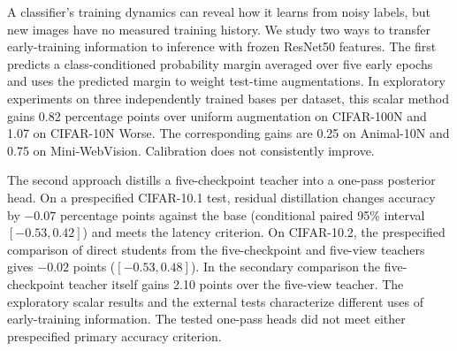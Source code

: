 A classifier's training dynamics can reveal how it learns from noisy
labels, but new images have no measured training history. We study two
ways to transfer early-training information to inference with frozen
ResNet50 features. The first predicts a class-conditioned probability
margin averaged over five early epochs and uses the predicted margin to
weight test-time augmentations. In exploratory experiments on three
independently trained bases per dataset, this scalar method gains 0.82
percentage points over uniform augmentation on CIFAR-100N and 1.07 on
CIFAR-10N Worse. The corresponding gains are 0.25 on Animal-10N and 0.75
on Mini-WebVision. Calibration does not consistently improve.

The second approach distills a five-checkpoint teacher into a one-pass
posterior head. On a prespecified CIFAR-10.1 test, residual distillation
changes accuracy by $-0.07$ percentage points against the base
(conditional paired 95\% interval $[-0.53, 0.42]$) and meets the latency
criterion. On CIFAR-10.2, the prespecified comparison of direct students
from the five-checkpoint and five-view teachers gives $-0.02$ points
($[-0.53, 0.48]$). In the secondary comparison the five-checkpoint teacher
itself gains 2.10 points over the five-view teacher. The exploratory
scalar results and the external tests characterize different uses of
early-training information. The tested one-pass heads did not meet
either prespecified primary accuracy criterion.
